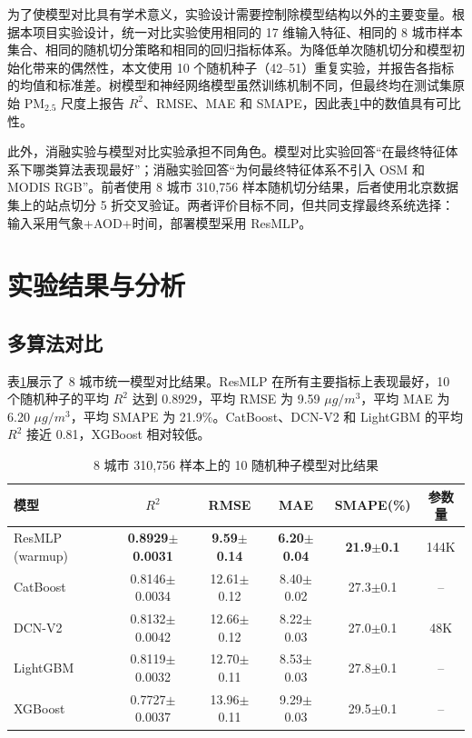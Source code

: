 ﻿\documentclass[UTF8,zihao=-4,a4paper]{ctexart}
\newcommand{\pmfine}{PM$_{2.5}$}
\newcommand{\aod}{AOD}
\begin{document}
为了使模型对比具有学术意义，实验设计需要控制除模型结构以外的主要变量。根据本项目实验设计，统一对比实验使用相同的 17 维输入特征、相同的 8 城市样本集合、相同的随机切分策略和相同的回归指标体系。为降低单次随机切分和模型初始化带来的偶然性，本文使用 10 个随机种子（42--51）重复实验，并报告各指标的均值和标准差。树模型和神经网络模型虽然训练机制不同，但最终均在测试集原始 \pmfine{} 尺度上报告 $R^2$、RMSE、MAE 和 SMAPE，因此表\ref{tab:model_compare}中的数值具有可比性。

此外，消融实验与模型对比实验承担不同角色。模型对比实验回答“在最终特征体系下哪类算法表现最好”；消融实验回答“为何最终特征体系不引入 OSM 和 MODIS RGB”。前者使用 8 城市 310,756 样本随机切分结果，后者使用北京数据集上的站点切分 5 折交叉验证。两者评价目标不同，但共同支撑最终系统选择：输入采用气象+\aod{}+时间，部署模型采用 ResMLP。

\section{实验结果与分析}

\subsection{多算法对比}

表\ref{tab:model_compare}展示了 8 城市统一模型对比结果。ResMLP 在所有主要指标上表现最好，10 个随机种子的平均 $R^2$ 达到 0.8929，平均 RMSE 为 9.59 $\mu g/m^3$，平均 MAE 为 6.20 $\mu g/m^3$，平均 SMAPE 为 21.9\%。CatBoost、DCN-V2 和 LightGBM 的平均 $R^2$ 接近 0.81，XGBoost 相对较低。

\begin{table}[H]
  \centering
  \caption{8 城市 310,756 样本上的 10 随机种子模型对比结果}
  \label{tab:model_compare}
  \begin{tabular}{lccccc}
    \toprule
    模型 & $R^2$ & RMSE & MAE & SMAPE(\%) & 参数量 \\
    \midrule
    ResMLP (warmup) & \textbf{0.8929$\pm$0.0031} & \textbf{9.59$\pm$0.14} & \textbf{6.20$\pm$0.04} & \textbf{21.9$\pm$0.1} & 144K \\
    CatBoost & 0.8146$\pm$0.0034 & 12.61$\pm$0.12 & 8.40$\pm$0.02 & 27.3$\pm$0.1 & -- \\
    DCN-V2 & 0.8132$\pm$0.0042 & 12.66$\pm$0.12 & 8.22$\pm$0.03 & 27.0$\pm$0.1 & 48K \\
    LightGBM & 0.8119$\pm$0.0032 & 12.70$\pm$0.11 & 8.53$\pm$0.03 & 27.8$\pm$0.1 & -- \\
    XGBoost & 0.7727$\pm$0.0037 & 13.96$\pm$0.11 & 9.29$\pm$0.03 & 29.5$\pm$0.1 & -- \\
    \bottomrule
  \end{tabular}
\end{table}
\end{document}

